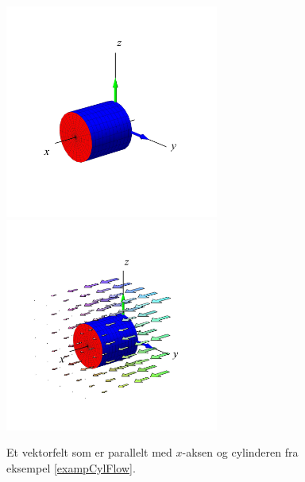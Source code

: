 \begin{figure}[ht]
\centerline{\includegraphics[width=70mm]{FIGS/plotCylFlow1}\includegraphics[width=70mm]{FIGS/plotCylFlow2}}
\begin{center}
\caption{\small{Et vektorfelt som er parallelt med $x$-aksen og cylinderen fra eksempel \ref{exampCylFlow}.}} \label{figCylFlow2}
\end{center}
\end{figure}





